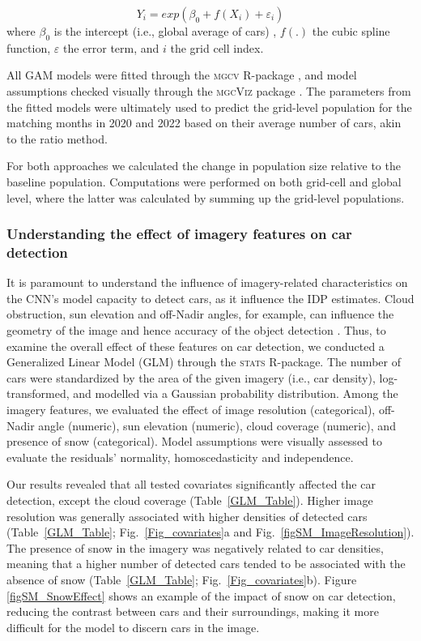 \documentclass[sn-basic]{sn-jnl}%
\begin{document}
{\begin{equation}
Y_{i} = exp(\beta_{0} + f(X_{i}) + \varepsilon_{i})
\end{equation}
where $\beta_{0}$ is the intercept (i.e., global average of cars) , $f(.)$ the cubic spline function, $\varepsilon$ the error term, and $i$ the grid cell index. 

All GAM models were fitted through the \textsc{mgcv} R-package \citep{Wood_2017}, and model assumptions checked visually through the \textsc{mgcViz} package \citep{Fasiolo_et_al_2018}. The parameters from the fitted models were ultimately used to predict the grid-level population for the matching months in 2020 and 2022 based on their average number of cars, akin to the ratio method. 

For both approaches we calculated the change in population size relative to the baseline population. Computations were performed on both grid-cell and global level, where the latter was calculated by summing up the grid-level populations.



\subsubsection{Understanding the effect of imagery features on car detection} \label{MMS5-3}
It is paramount to understand the influence of imagery-related characteristics on the CNN's model capacity to detect cars, as it influence the IDP estimates. Cloud obstruction, sun elevation and off-Nadir angles, for example, can influence the geometry of the image and hence accuracy of the object detection \citep{Li_et_al_2020, Wang_et_al_2022}. Thus, to examine the overall effect of these features on car detection, we conducted a Generalized Linear Model (GLM) through the \textsc{stats} R-package. The number of cars were standardized by the area of the given imagery (i.e., car density), log-transformed, and modelled via a Gaussian probability distribution. Among the imagery features, we evaluated the effect of image resolution (categorical), off-Nadir angle (numeric), sun elevation (numeric), cloud coverage (numeric), and presence of snow (categorical). Model assumptions were visually assessed to evaluate the residuals’ normality, homoscedasticity and independence. 

Our results revealed that all tested covariates significantly affected the car detection, except the cloud coverage (Table~\ref{GLM_Table}). Higher image resolution was generally associated with higher densities of detected cars (Table~\ref{GLM_Table}; Fig.~\ref{Fig_covariates}a and Fig.~\ref{figSM_ImageResolution}). The presence of snow in the imagery was negatively related to car densities, meaning that a higher number of detected cars tended to be associated with the absence of snow (Table~\ref{GLM_Table}; Fig.~\ref{Fig_covariates}b). Figure \ref{figSM_SnowEffect} shows an example of the impact of snow on car detection, reducing the contrast between cars and their surroundings, making it more difficult for the model to discern cars in the image. %

}
\end{document}
